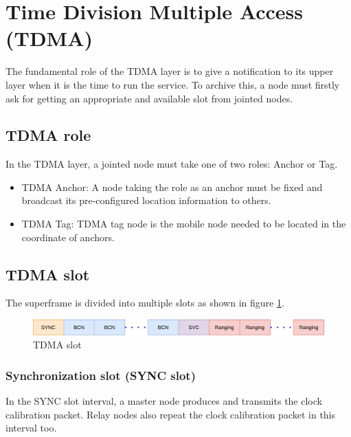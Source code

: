 \documentclass[\main/main.tex]{subfiles}
\begin{document}

\section{Time Division Multiple Access (TDMA)}
The fundamental role of the TDMA layer is to give a notification to its upper layer when it is the time to run the service. To archive this, a node must firstly ask for getting an appropriate and available slot from jointed nodes.

\subsection{TDMA role}
In the TDMA layer, a jointed node must take one of two roles: Anchor or Tag.
\begin{itemize}
    \item TDMA Anchor: A node taking the role as an anchor must be fixed and broadcast its pre-configured location information to others.
    \item TDMA Tag: TDMA tag node is the mobile node needed to be located in the coordinate of anchors.
\end{itemize}

\subsection{TDMA slot}
The superframe is divided into multiple slots as shown in figure \ref{fig:tdma_slot}.
\begin{figure}[H]
    \begin{center}
        \includegraphics[scale=0.4]{tdma_slot.png}
    \end{center}
    \caption{TDMA slot}
    \label{fig:tdma_slot}
\end{figure}

\subsubsection{Synchronization slot (SYNC slot)}
In the SYNC slot interval, a master node produces and transmits the clock calibration packet. Relay nodes also repeat the clock calibration packet in this interval too.
\end{document}
